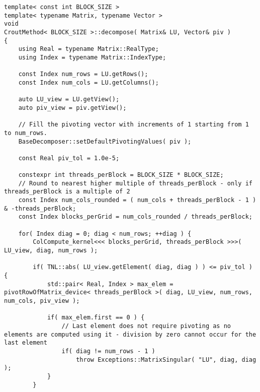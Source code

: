 \begin{lstlisting}[caption={Excerpt from the implementation of PCM\_$x$PP.
The template parameter \code{BLOCK\_SIZE} is equivalent to $x$ in PCM\_$x$PP.
On input, matrix \code{LU} is assumed to contain the values of $\mathbf{A}$, and \code{piv} is expected to be appropriately sized.
Furthermore, unlike \code{LU}, \code{piv} is assumed to be allocated on the Host.
The \code{pivotRowOfMatrix\_device()} function, presented below the \code{decompose()} method, is implemented in the parent class of \code{CroutMethod}: \code{BaseDecomposer}.
Note that the code has been slightly modified for brevity.
For example, the \code{swapRows\_device()} function has been omitted as it is a basic operation, and the checks for appropriate sizing of matrices and vectors have been removed.},label={Listing:PCMxPP-implementation-excerpt}]
template< const int BLOCK_SIZE >
template< typename Matrix, typename Vector >
void
CroutMethod< BLOCK_SIZE >::decompose( Matrix& LU, Vector& piv )
{
	using Real = typename Matrix::RealType;
	using Index = typename Matrix::IndexType;
	
	const Index num_rows = LU.getRows();
	const Index num_cols = LU.getColumns();
	
	auto LU_view = LU.getView();
	auto piv_view = piv.getView();
	
	// Fill the pivoting vector with increments of 1 starting from 1 to num_rows.
	BaseDecomposer::setDefaultPivotingValues( piv );
	
	const Real piv_tol = 1.0e-5;
	
	constexpr int threads_perBlock = BLOCK_SIZE * BLOCK_SIZE;
	// Round to nearest higher multiple of threads_perBlock - only if threads_perBlock is a multiple of 2
	const Index num_cols_rounded = ( num_cols + threads_perBlock - 1 ) & -threads_perBlock;
	const Index blocks_perGrid = num_cols_rounded / threads_perBlock;
	
	for( Index diag = 0; diag < num_rows; ++diag ) {
		ColCompute_kernel<<< blocks_perGrid, threads_perBlock >>>( LU_view, diag, num_rows );
		
		if( TNL::abs( LU_view.getElement( diag, diag ) ) <= piv_tol ) {
			std::pair< Real, Index > max_elem = pivotRowOfMatrix_device< threads_perBlock >( diag, LU_view, num_rows, num_cols, piv_view );
			
			if( max_elem.first == 0 ) {
				// Last element does not require pivoting as no elements are computed using it - division by zero cannot occur for the last element
				if( diag != num_rows - 1 )
					throw Exceptions::MatrixSingular( "LU", diag, diag );
			}
		}
		

\end{lstlisting}
